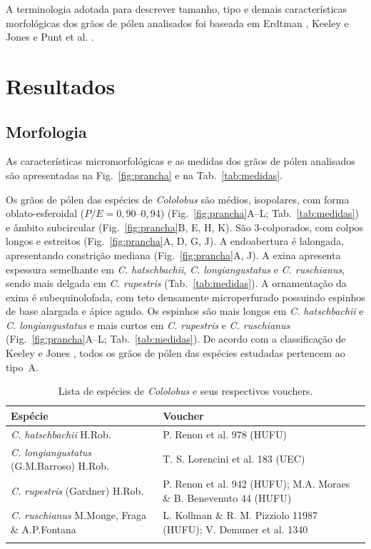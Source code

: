 \documentclass[pdflatex,sn-mathphys-num]{sn-jnl}
\begin{document}
A terminologia adotada para descrever tamanho, tipo e demais características morfológicas dos grãos de pólen analisados foi baseada em Erdtman \cite{erdtman1952}, Keeley e Jones \cite{keeley1977,keeley1979} e Punt et al. \cite{punt2007}.

\section{Resultados}\label{sec:resultados}

\subsection{Morfologia}\label{subsec:morfologia}

As características micromorfológicas e as medidas dos grãos de pólen analisados são apresentadas na Fig.~\ref{fig:prancha} e na Tab.~\ref{tab:medidas}.

Os grãos de pólen das espécies de \textit{Cololobus} são médios, isopolares, com forma oblato-esferoidal ($P/E = 0{,}90$--$0{,}94$) (Fig.~\ref{fig:prancha}A--L; Tab.~\ref{tab:medidas}) e âmbito subcircular (Fig.~\ref{fig:prancha}B, E, H, K). São 3-colporados, com colpos longos e estreitos (Fig.~\ref{fig:prancha}A, D, G, J). A endoabertura é lalongada, apresentando constrição mediana (Fig.~\ref{fig:prancha}A, J). A exina apresenta espessura semelhante em \textit{C. hatschbachii}, \textit{C. longiangustatus} e \textit{C. ruschianus}, sendo mais delgada em \textit{C. rupestris} (Tab.~\ref{tab:medidas}). A ornamentação da exina é subequinolofada, com teto densamente microperfurado possuindo espinhos de base alargada e ápice agudo. Os espinhos são mais longos em \textit{C. hatschbachii} e \textit{C. longiangustatus} e mais curtos em \textit{C. rupestris} e \textit{C. ruschianus} (Fig.~\ref{fig:prancha}A--L; Tab.~\ref{tab:medidas}). De acordo com a classificação de Keeley e Jones \cite{keeley1977,keeley1979}, todos os grãos de pólen das espécies estudadas pertencem ao tipo~A.

\begin{table}[htbp]
\caption{Lista de espécies de \textit{Cololobus} e seus respectivos vouchers.}\label{tab:vouchers}
\small
\begin{tabular*}{\textwidth}{@{\extracolsep\fill}p{}p{}@{}}
\toprule
Espécie & Voucher \\
\midrule
\textit{C. hatschbachii} H.Rob. & P. Renon et al. 978 (HUFU) \\
\textit{C. longiangustatus} (G.M.Barroso) H.Rob. & T. S. Lorencini et al. 183 (UEC) \\
\textit{C. rupestris} (Gardner) H.Rob. & P. Renon et al. 942 (HUFU); M.A. Moraes \& B. Benevenuto 44 (HUFU) \\
\textit{C. ruschianus} M.Monge, Fraga \& A.P.Fontana & L. Kollman \& R. M. Pizziolo 11987 (HUFU); V. Demuner et al. 1340 \\
\botrule
\end{tabular*}
\end{table}
\end{document}
